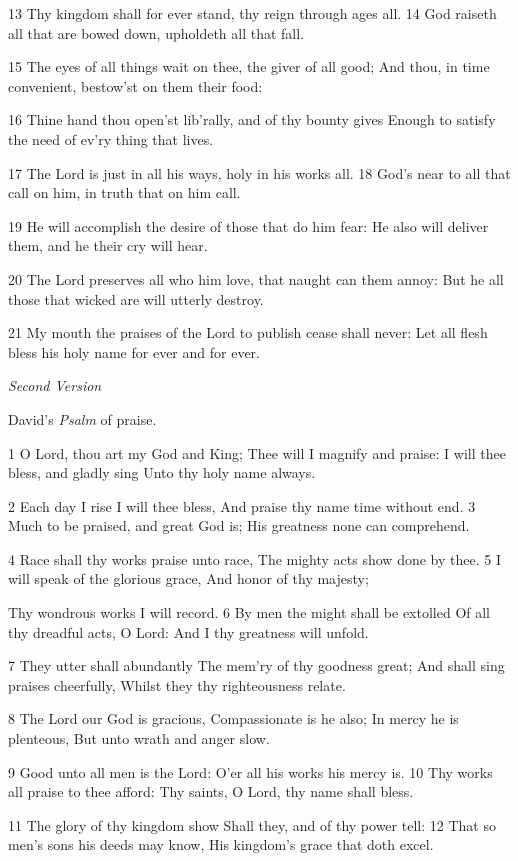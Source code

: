 13 Thy kingdom shall for ever stand,
thy reign through ages all.
14 God raiseth all that are bowed down,
upholdeth all that fall.

15 The eyes of all things wait on thee,
the giver of all good;
And thou, in time convenient,
bestow’st on them their food:

16 Thine hand thou open’st lib’rally,
and of thy bounty gives
Enough to satisfy the need
of ev’ry thing that lives.

17 The Lord is just in all his ways,
holy in his works all.
18 God’s near to all that call on him,
in truth that on him call.

19 He will accomplish the desire
of those that do him fear:
He also will deliver them,
and he their cry will hear.

20 The Lord preserves all who him love,
that naught can them annoy:
But he all those that wicked are
will utterly destroy.

21 My mouth the praises of the Lord
to publish cease shall never:
Let all flesh bless his holy name
for ever and for ever.

\emph{Second Version}

David’s \emph{Psalm} of praise.

1 O Lord, thou art my God and King;
Thee will I magnify and praise:
I will thee bless, and gladly sing
Unto thy holy name always.

2 Each day I rise I will thee bless,
And praise thy name time without end.
3 Much to be praised, and great God is;
His greatness none can comprehend.

4 Race shall thy works praise unto race,
The mighty acts show done by thee.
5 I will speak of the glorious grace,
And honor of thy majesty;

Thy wondrous works I will record.
6 By men the might shall be extolled
Of all thy dreadful acts, O Lord:
And I thy greatness will unfold.

7 They utter shall abundantly
The mem’ry of thy goodness great;
And shall sing praises cheerfully,
Whilst they thy righteousness relate.

8 The Lord our God is gracious,
Compassionate is he also;
In mercy he is plenteous,
But unto wrath and anger slow.

9 Good unto all men is the Lord:
O’er all his works his mercy is.
10 Thy works all praise to thee afford:
Thy saints, O Lord, thy name shall bless.

11 The glory of thy kingdom show
Shall they, and of thy power tell:
12 That so men’s sons his deeds may know,
His kingdom’s grace that doth excel.

